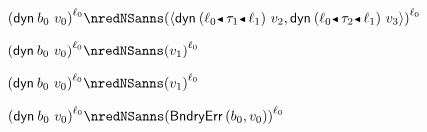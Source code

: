 {\begin{lamportproof*}
    \begin{pfproof}
      \qedstep
        \begin{pfproof}
          $\obars{\edynb{\sbnd_0}{\svalue_0}}{\sowner_0} \nredNSanns \obars{\epair{\edynb{\obnd{\sowner_0}{\stype_1}{\sowner_1}}{\svalue_2}}{\edynb{\obnd{\sowner_0}{\stype_2}{\sowner_1}}{\svalue_3}}}{\sowner_0}$
        \end{pfproof}
    \end{pfproof}

    \begin{pfproof}
      \qedstep
        \begin{pfproof}
          $\obars{\edynb{\sbnd_0}{\svalue_0}}{\sowner_0} \nredNSanns \obars{\svalue_1}{\sowner_0}$
        \end{pfproof}
    \end{pfproof}

    \begin{pfproof}
      \qedstep
        \begin{pfproof}
          $\obars{\edynb{\sbnd_0}{\svalue_0}}{\sowner_0} \nredNSanns \obars{\svalue_1}{\sowner_0}$
        \end{pfproof}
    \end{pfproof}

    \begin{pfproof}
      \qedstep
        \begin{pfproof}
          $\obars{\edynb{\sbnd_0}{\svalue_0}}{\sowner_0} \nredNSanns \obars{\boundaryerror{\sbnd_0}{\svalue_0}}{\sowner_0}$
        \end{pfproof}
    \end{pfproof}

\end{lamportproof*}}

